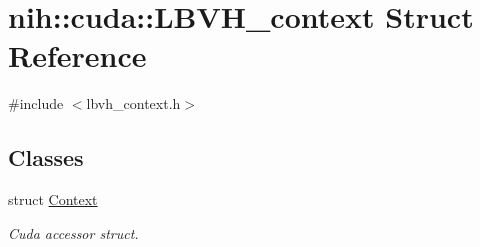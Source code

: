 \hypertarget{structnih_1_1cuda_1_1_l_b_v_h__context}{
\section{nih\-:\-:cuda\-:\-:\-L\-B\-V\-H\-\_\-context \-Struct \-Reference}
\label{structnih_1_1cuda_1_1_l_b_v_h__context}
}


{\ttfamily \#include $<$lbvh\-\_\-context.\-h$>$}

\subsection*{\-Classes}
\begin{DoxyCompactItemize}
\item 
struct \hyperlink{structnih_1_1cuda_1_1_l_b_v_h__context_1_1_context}{\-Context}
\begin{DoxyCompactList}\small\item\em \-Cuda accessor struct. \end{DoxyCompactList}\end{DoxyCompactItemize}
